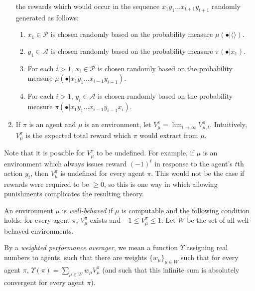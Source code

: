 \documentclass[runningheads]{llncs}
\begin{document}
\begin{definition}
\begin{enumerate}
        the rewards which would occur in the sequence
        $x_1y_1\ldots x_{t+1}y_{t+1}$
        randomly generated as follows:
        \begin{enumerate}
            \item $x_1\in \mathcal P$ is chosen randomly based
            on the probability measure $\mu(\bullet|\langle\rangle)$.
            \item $y_1\in\mathcal A$ is chosen randomly based on the probability
            measure $\pi(\bullet|x_1)$.
            \item
            For each $i>1$,
            $x_i\in\mathcal P$ is chosen randomly based on
            the probability measure
            $\mu(\bullet|x_1y_1\ldots x_{i-1}y_{i-1})$.
            \item
            For each $i>1$,
            $y_i\in\mathcal A$ is chosen randomly based on the probability measure
            $\pi(\bullet|x_1y_1\ldots x_{i-1}y_{i-1}x_i)$.
        \end{enumerate}
        \item
        If $\pi$ is an agent and $\mu$ is an environment,
        let $V^\pi_\mu=\lim_{t\to\infty}V^{\pi}_{\mu,t}$.
        Intuitively, $V^\pi_\mu$ is the expected total reward which $\pi$ would extract
        from $\mu$.
    \end{enumerate}
\end{definition}

Note that it is possible for $V^\pi_\mu$ to be undefined.
For example, if $\mu$ is an environment which always issues
reward $(-1)^t$ in response to the agent's $t$th action $y_t$,
then $V^\pi_\mu$ is undefined for every agent $\pi$.
This would not be the case if rewards were required to be $\geq 0$,
so this is one way in which allowing
punishments complicates the resulting theory.

\begin{definition}
    An environment $\mu$ is \emph{well-behaved} if $\mu$ is computable and the following
    condition holds: for every agent $\pi$, $V^\pi_\mu$ exists and
    $-1\leq V^\pi_\mu\leq 1$. Let $W$ be the set of all well-behaved environments.
\end{definition}

\begin{definition}
\label{performanceaveragerdefn}
    By a \emph{weighted performance averager}, we mean a function
    $\Upsilon$ assigning real numbers to agents, such that there
    are weights $\{w_\mu\}_{\mu\in W}$ such that for every agent
    $\pi$, $\Upsilon(\pi)=\sum_{\mu\in W}w_\mu V^\pi_\mu$
    (and such that this infinite sum is absolutely convergent
    for every agent $\pi$).
\end{definition}
\end{document}
